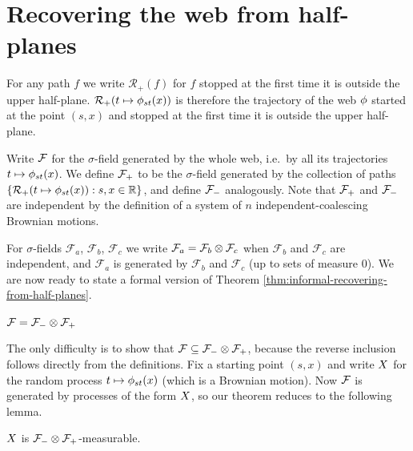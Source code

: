 \newcommand{\indepbm}{\psi}
\newcommand{\toinP}{\overset{\P}\to}
\newcommand{\statementoflemresampledetosampled}{$\resamplede \toinP \sampled$ as $\epsilon \to 0$}
{
\section{Recovering the web from half-planes}
\label{sec:recovering-from-half-planes}

\newcommand{\restrictupper}{\mathcal{R}_{+}}

  For any path $f$ we write $\restrictupper(f)$ for $f$ stopped at the
  first time it is outside the upper half-plane.
  $\restrictupper(t \mapsto \web{s}{t}{x})$ is therefore the trajectory of the
  web $\phi$ started at the point $(s,x)$ and stopped at the first
  time it is outside the upper half-plane.

  Write $\mathcal{F}$ for the $\sigma$-field generated by the
  whole web, i.e.\ by all its trajectories $t \mapsto \phi_{{s}{t}}(x)$.
  We define $\mathcal{F}_{+}$ to be the $\sigma$-field generated by the
  collection of paths $\{\restrictupper(t \mapsto \web{s}{t}{x}) : s,x
  \in \R \}$, and define $\mathcal{F}_{-}$ analogously.
  Note that $\mathcal{F}_{+}$ and $\mathcal{F}_{-}$ are independent by the definition of
  a system of $n$ independent-coalescing Brownian motions.

  \newcommand{\F}{\mathcal{F}}
  For $\sigma$-fields $\F_a$, $\F_b$, $\F_c$ we write $\F_a = \F_b
  \tensor \F_c$ when $\F_b$ and $\F_c$ are independent, and $\F_a$
  is generated by $\F_b$ and $\F_c$ (up to sets of measure $0$).
  We are now ready to state a formal version of Theorem
  \ref{thm:informal-recovering-from-half-planes}.

\begin{theorem}\label{thm:recoveringfromhalfplanes}
  $\mathcal{F} = \mathcal{F}_{-} \otimes \mathcal{F}_{+}$
\end{theorem}

The only difficulty is to show that $\mathcal{F} \subseteq \mathcal{F}_{-} \otimes \mathcal{F}_{+}$,
because the reverse inclusion follows directly from the definitions.
Fix a starting point $(s,x)$ and write $X$ for the random
process $t \mapsto \phi_{{s}{t}}(x)$ (which is a Brownian motion).  Now
$\mathcal{F}$ is generated by processes of the form $X$, so
our theorem reduces to the following lemma.

\begin{lemma}
  \label{lem:sampled-twostrip-meas}
  $X$ is $\mathcal{F}_{-} \otimes \mathcal{F}_{+}$-measurable.
\end{lemma}

}
